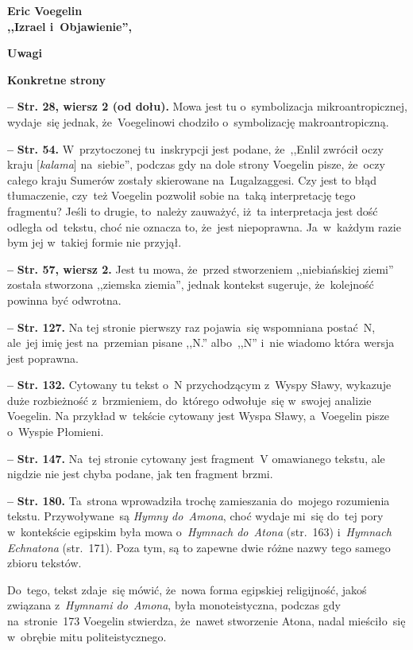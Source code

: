 \documentclass[a4paper,11pt]{article}
\newcommand{\spaceThree}{0.25em}
\newcommand{\tb}{\textbf}
\newcommand{\noi}{\noindent}
\newcommand{\start}{\noi \tb{--} {}}
\newcommand{\Center}[1]{\begin{center} #1 \end{center}}
\newcommand{\CenterTB}[1]{\Center{\tb{#1}}}
\newcommand{\Str}[1]{\tb{Str. #1.}}
\newcommand{\StrWg}[2]{\tb{Str. #1, wiersz #2.}}
\newcommand{\StrWd}[2]{\tb{Str. #1, wiersz #2 (od dołu).}}
\newcommand{\Work}[1]{ \begin{center} {\large \tb{#1}} \end{center} }
\begin{document}
\Work{
  Eric Voegelin \\
  ,,Izrael i~Objawienie'', \cite{Voe14} }


\CenterTB{Uwagi}

\noi \tb{Konkretne strony}

\vspace{\spaceThree}

\start \StrWd{28}{2} Mowa jest tu o~symbolizacja mikroantropicznej,
wydaje~się jednak, że~Voegelinowi chodziło o~symbolizację
makroantropiczną.


\start \Str{54} W~przytoczonej tu~inskrypcji jest podane, że~,,Enlil
zwrócił oczy kraju [\emph{kalama}] na~siebie'', podczas gdy na dole
strony Voegelin pisze, że~oczy całego kraju Sumerów zostały skierowane
na~Lugalzaggesi. Czy jest to błąd tłumaczenie, czy~też Voegelin
pozwolił sobie na~taką interpretację tego fragmentu? Jeśli to drugie,
to~należy zauważyć, iż~ta interpretacja jest dość odległa od~tekstu,
choć nie oznacza to, że~jest niepoprawna. Ja~w~każdym razie bym jej
w~takiej formie nie przyjął.


\start \StrWg{57}{2} Jest tu mowa, że~przed stworzeniem ,,niebiańskiej
ziemi'' została stworzona ,,ziemska ziemia'', jednak kontekst
sugeruje, że~kolejność powinna być odwrotna.


\start \Str{127} Na tej stronie pierwszy raz pojawia~się wspomniana
postać~N, ale~jej imię jest na~przemian pisane ,,N.'' albo~,,N'' i~nie
wiadomo która wersja jest poprawna.


\start \Str{132} Cytowany tu tekst o~N przychodzącym z~Wyspy Sławy,
wykazuje duże rozbieżność z~brzmieniem, do~którego odwołuje~się
w~swojej analizie Voegelin. Na przykład w~tekście cytowany jest Wyspa
Sławy, a~Voegelin pisze o~Wyspie Płomieni.


\start \Str{147} Na~tej stronie cytowany jest fragment~V omawianego
tekstu, ale nigdzie nie jest chyba podane, jak ten fragment brzmi.

\start \Str{180} Ta~strona wprowadziła trochę zamieszania do~mojego
rozumienia tekstu. Przywoływane~są \emph{Hymny do~Amona}, choć wydaje
mi~się do~tej pory w~kontekście egipskim była mowa o~\emph{Hymnach
  do~Atona} (str.~163) i~\emph{Hymnach Echnatona} (str.~171). Poza
tym, są to zapewne dwie różne nazwy tego samego zbioru tekstów.

Do~tego, tekst zdaje~się mówić, że~nowa forma egipskiej religijność,
jakoś związana z~\emph{Hymnami do~Amona}, była monoteistyczna, podczas
gdy na~stronie~173 Voegelin stwierdza, że~nawet stworzenie Atona,
nadal mieściło~się w~obrębie mitu politeistycznego.
\end{document}

